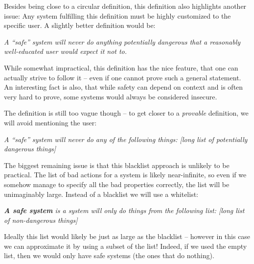 Besides being close to a circular definition, this definition also highlights
another issue: Any system fulfilling this definition must be highly customized
to the specific user. A slightly better definition would be:

\vspace{0.3cm}
\begin{addmargin}{1cm}
  {\it A ``safe'' system will never do anything potentially dangerous that a
    reasonably well-educated user would expect it not to.}
\end{addmargin}
\vspace{0.3cm}

While somewhat impractical, this definition has the nice feature, that one can
actually strive to follow it -- even if one cannot prove such a general
statement. An interesting fact is also, that while safety can depend on context
and is often very hard to prove, some systems would always be considered
insecure.

The definition is still too vague though -- to get closer to a \emph{provable}
definition, we will avoid mentioning the user:

\vspace{0.3cm}
\begin{addmargin}{1cm}
  {\it A ``safe'' system will never do any of the following things: [long list
    of potentially dangerous things]}
\end{addmargin}
\vspace{0.3cm}

The biggest remaining issue is that this blacklist approach is unlikely to be
practical. The list of bad actions for a system is likely near-infinite, so even
if we somehow manage to specify all the bad properties correctly, the list will
be unimaginably large. Instead of a blacklist we will use a whitelist:

\vspace{0.3cm}
\begin{addmargin}{1cm}
  {\it \textbf{A safe system} is a system will only do things from the following
    list: [long list of non-dangerous things]}
\end{addmargin}
\vspace{0.3cm}

Ideally this list would likely be just as large as the blacklist -- however in
this case we can approximate it by using a subset of the list! Indeed, if we
used the empty list, then we would only have safe systems (the ones that do
nothing).

